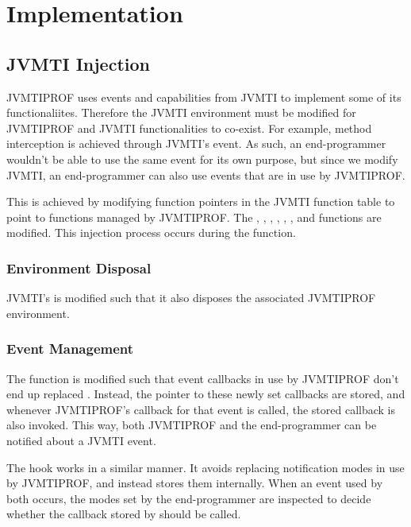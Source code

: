 \section{Implementation} \label{sec:impl}

\subsection{JVMTI Injection}

JVMTIPROF uses events and capabilities from JVMTI to implement some of its functionaliites. Therefore the JVMTI environment must be modified for JVMTIPROF and JVMTI functionalities to co-exist. For example, method interception is achieved through JVMTI's  event. As such, an end-programmer wouldn't be able to use the same event for its own purpose, but since we modify JVMTI, an end-programmer can also use events that are in use by JVMTIPROF.

This is achieved by modifying function pointers in the JVMTI function table to point to functions managed by JVMTIPROF. The , , , , , ,  and  functions are modified. This injection process occurs during the  function.

\subsubsection*{Environment Disposal}

JVMTI's  is modified such that it also disposes the associated JVMTIPROF environment.

\subsubsection*{Event Management}

The  function is modified such that event callbacks in use by JVMTIPROF don't end up replaced . Instead, the pointer to these newly set callbacks are stored, and whenever JVMTIPROF's callback for that event is called, the stored callback is also invoked. This way, both JVMTIPROF and the end-programmer can be notified about a JVMTI event.

The  hook works in a similar manner. It avoids replacing notification modes in use by JVMTIPROF, and instead stores them internally. When an event used by both occurs, the modes set by the end-programmer are inspected to decide whether the callback stored by  should be called.

